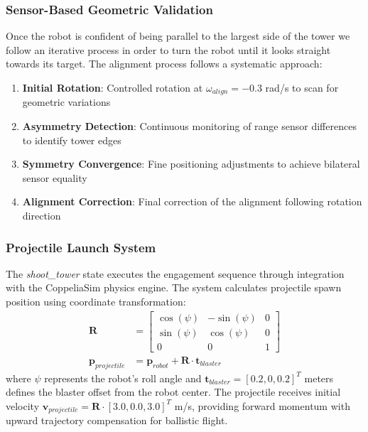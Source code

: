 \subsubsection*{Sensor-Based Geometric Validation}
Once the robot is confident of being parallel to the largest side of the tower we follow an iterative process in order to turn the robot until it looks straight towards its target. The alignment process follows a systematic approach:
\begin{enumerate}
\item \textbf{Initial Rotation}: Controlled rotation at $\omega_{align} = -0.3$ rad/s to scan for geometric variations
\item \textbf{Asymmetry Detection}: Continuous monitoring of range sensor differences to identify tower edges
\item \textbf{Symmetry Convergence}: Fine positioning adjustments to achieve bilateral sensor equality
\item \textbf{Alignment Correction}: Final correction of the alignment following rotation direction
\end{enumerate}
\subsubsection{Projectile Launch System}
The \textit{shoot\_tower} state executes the engagement sequence through integration with the CoppeliaSim physics engine. The system calculates projectile spawn position using coordinate transformation:
\begin{align} \mathbf{R} &= \begin{bmatrix} \cos(\psi) & -\sin(\psi) & 0 \\ \sin(\psi) & \cos(\psi) & 0 \\ 0 & 0 & 1 \end{bmatrix} \\ \mathbf{p}_{projectile} &= \mathbf{p}_{robot} + \mathbf{R} \cdot \mathbf{t}_{blaster} \end{align}
where $\psi$ represents the robot's roll angle and $\mathbf{t}_{blaster} = [0.2, 0, 0.2]^T$ meters defines the blaster offset from the robot center.
The projectile receives initial velocity $\mathbf{v}_{projectile} = \mathbf{R} \cdot [3.0, 0.0, 3.0]^T$ m/s, providing forward momentum with upward trajectory compensation for ballistic flight.